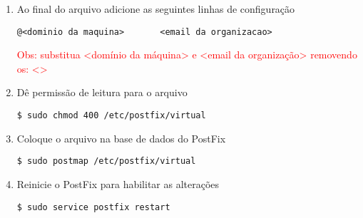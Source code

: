 \begin{enumerate}[label=\alph*)]
\item Ao final do arquivo adicione as seguintes linhas de configuração
\begin{lstlisting}
@<dominio da maquina>		<email da organizacao>
\end{lstlisting}
\textcolor{red}{{\scriptsize Obs: substitua <domínio da máquina> e <email da organização> removendo os: <> }}

\item Dê permissão de leitura para o arquivo
\begin{lstlisting}
$ sudo chmod 400 /etc/postfix/virtual
\end{lstlisting}

\item Coloque o arquivo na base de dados do PostFix
\begin{lstlisting}
$ sudo postmap /etc/postfix/virtual
\end{lstlisting}

\item Reinicie o PostFix para habilitar as alterações
\begin{lstlisting}
$ sudo service postfix restart
\end{lstlisting}

\end{enumerate}